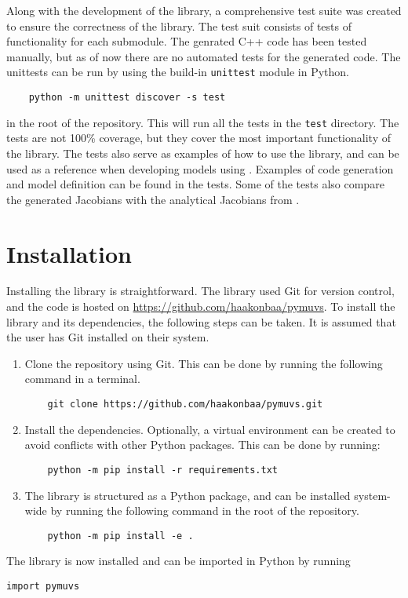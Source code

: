 Along with the development of the \pymuvs{} library, a comprehensive test suite
was created to ensure the correctness of the library. The test suit consists of
tests of functionality for each submodule. The genrated C++ code has been tested
manually, but as of now there are no automated tests for the generated code. The
unittests can be run by using the build-in \texttt{unittest} module in Python.
\begin{verbatim}
    python -m unittest discover -s test
\end{verbatim}
in the root of the repository. This will run all the tests in the \texttt{test}
directory. The tests are not 100\% coverage, but they cover the most important
functionality of the library. The tests also serve as examples of how to use the
library, and can be used as a reference when developing models using \pymuvs{}.
Examples of code generation and model definition can be found in the tests. Some
of the tests also compare the generated Jacobians with the analytical Jacobians
from \cite{fossen2021}.


\section{Installation}

Installing the \pymuvs{ }library is straightforward. The library used Git for
version control, and the code is hosted on \url{https://github.com/haakonbaa/pymuvs}.
To install the library and its dependencies, the following steps can be taken. It
is assumed that the user has Git installed on their system.
\begin{enumerate}
    \item Clone the repository using Git. This can be done by running the following
    command in a terminal.
    \begin{verbatim}
    git clone https://github.com/haakonbaa/pymuvs.git
    \end{verbatim}
    \item Install the dependencies. Optionally, a virtual environment can be created
    to avoid conflicts with other Python packages. This can be done by running:
    \begin{verbatim}
    python -m pip install -r requirements.txt
    \end{verbatim}
\item The library is structured as a Python package, and can be installed system-wide
    by running the following command in the root of the repository.
    \begin{verbatim}
    python -m pip install -e .
    \end{verbatim}
\end{enumerate}
The library is now installed and can be imported in Python by running
\begin{lstlisting}[caption={Importing the \pymuvs{ }package},
    style=custompython,
    label={lst:pymuvs:example}]
import pymuvs
\end{lstlisting}

